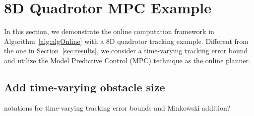 \section{8D Quadrotor MPC Example \label{sec:results}}
%
In this section, we demonstrate the online computation framework in Algorithm~\ref{alg:algOnline} with a 8D quadrotor tracking example. Different from the one in Section~\ref{sec:results}, we consider a time-varying tracking error bound and utilize the Model Predictive Control (MPC) technique as the online planner. 
%
\subsection{Add time-varying obstacle size}
\color{blue} notations for time-varying tracking error bounds and Minkowski addition?\color{black}
%
